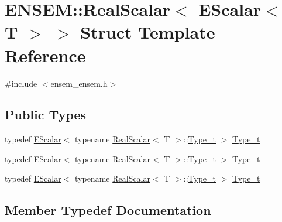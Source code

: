 \hypertarget{structENSEM_1_1RealScalar_3_01EScalar_3_01T_01_4_01_4}{}\section{E\+N\+S\+EM\+:\+:Real\+Scalar$<$ E\+Scalar$<$ T $>$ $>$ Struct Template Reference}
\label{structENSEM_1_1RealScalar_3_01EScalar_3_01T_01_4_01_4}


{\ttfamily \#include $<$ensem\+\_\+ensem.\+h$>$}

\subsection*{Public Types}
\begin{DoxyCompactItemize}
\item 
typedef \mbox{\hyperlink{classENSEM_1_1EScalar}{E\+Scalar}}$<$ typename \mbox{\hyperlink{structENSEM_1_1RealScalar}{Real\+Scalar}}$<$ T $>$\+::\mbox{\hyperlink{structENSEM_1_1RealScalar_3_01EScalar_3_01T_01_4_01_4_a5aaad1821350deadcff050085f21ff07}{Type\+\_\+t}} $>$ \mbox{\hyperlink{structENSEM_1_1RealScalar_3_01EScalar_3_01T_01_4_01_4_a5aaad1821350deadcff050085f21ff07}{Type\+\_\+t}}
\item 
typedef \mbox{\hyperlink{classENSEM_1_1EScalar}{E\+Scalar}}$<$ typename \mbox{\hyperlink{structENSEM_1_1RealScalar}{Real\+Scalar}}$<$ T $>$\+::\mbox{\hyperlink{structENSEM_1_1RealScalar_3_01EScalar_3_01T_01_4_01_4_a5aaad1821350deadcff050085f21ff07}{Type\+\_\+t}} $>$ \mbox{\hyperlink{structENSEM_1_1RealScalar_3_01EScalar_3_01T_01_4_01_4_a5aaad1821350deadcff050085f21ff07}{Type\+\_\+t}}
\item 
typedef \mbox{\hyperlink{classENSEM_1_1EScalar}{E\+Scalar}}$<$ typename \mbox{\hyperlink{structENSEM_1_1RealScalar}{Real\+Scalar}}$<$ T $>$\+::\mbox{\hyperlink{structENSEM_1_1RealScalar_3_01EScalar_3_01T_01_4_01_4_a5aaad1821350deadcff050085f21ff07}{Type\+\_\+t}} $>$ \mbox{\hyperlink{structENSEM_1_1RealScalar_3_01EScalar_3_01T_01_4_01_4_a5aaad1821350deadcff050085f21ff07}{Type\+\_\+t}}
\end{DoxyCompactItemize}


\subsection{Member Typedef Documentation}
\mbox{\label{structENSEM_1_1RealScalar_3_01EScalar_3_01T_01_4_01_4_a5aaad1821350deadcff050085f21ff07}} 
